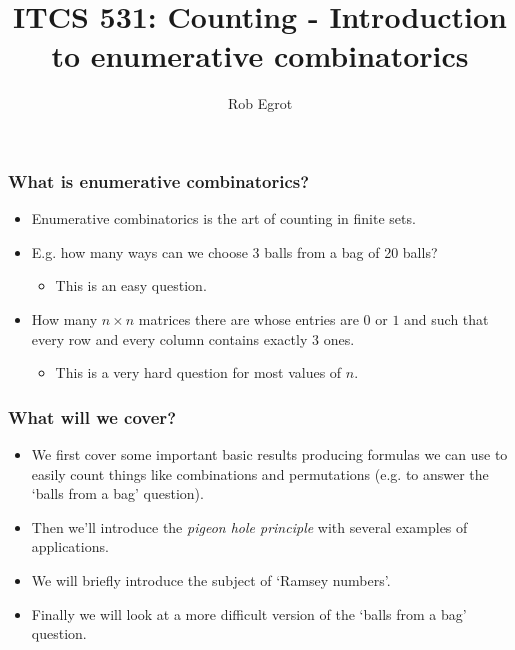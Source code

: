 \documentclass[handout]{beamer}
\title{ITCS 531: Counting - Introduction to enumerative combinatorics}
\date{}
\author{Rob Egrot}
\begin{document}
\begin{frame}
\titlepage
\end{frame}

\begin{frame}
\frametitle{What is enumerative combinatorics?}
\begin{itemize}
\item Enumerative combinatorics is the art of counting in finite sets.\vspace{0.5cm}
\item E.g. how many ways can we choose 3 balls from a bag of 20 balls?\vspace{0.2cm}
\begin{itemize} 
\item This is an easy question.
\end{itemize}\vspace{0.5cm}
\item How many $n\times n$ matrices there are whose entries are $0$ or $1$ and such that every row and every column contains exactly 3 ones.
\begin{itemize} \vspace{0.2cm}
\item This is a very hard question for most values of $n$.
\end{itemize}
\end{itemize}
\end{frame}

\begin{frame}
\frametitle{What will we cover?}
\begin{itemize}
\item We first cover some important basic results producing formulas we can use to easily count things like combinations and permutations (e.g. to answer the `balls from a bag' question). \vspace{0.5cm}
\item Then we'll introduce the \emph{pigeon hole principle} with several examples of applications. \vspace{0.5cm}
\item We will briefly introduce the subject of `Ramsey numbers'. \vspace{0.5cm}
\item Finally we will look at a more difficult version of the `balls from a bag' question.  
\end{itemize}
\end{frame}
\end{document}

